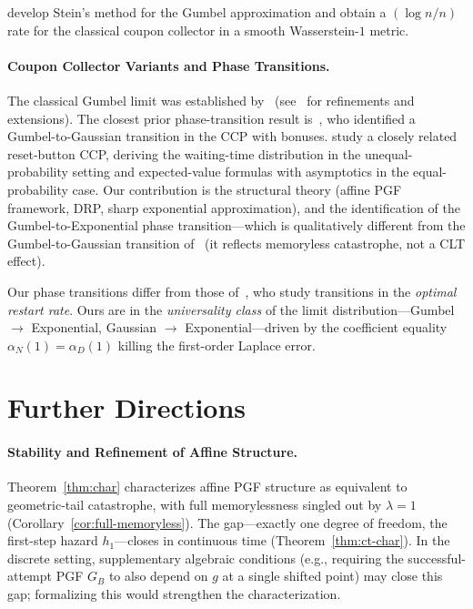 \documentclass[11pt]{article}
\theoremstyle{plain}
\theoremstyle{definition}
\theoremstyle{remark}
\begin{document}
\cite{CostacequeDecreusefond26} develop Stein's method for the Gumbel approximation and obtain a $(\log n/n)$ rate for the classical coupon collector in a smooth Wasserstein-$1$ metric.

\paragraph{Coupon Collector Variants and Phase Transitions.}
The classical Gumbel limit was established by~\cite{ER61} (see~\cite{BB65, FGT92, FS09, DP12, Neal08} for refinements and extensions).  The closest prior phase-transition result is~\cite{NK06}, who identified a Gumbel-to-Gaussian transition in the CCP with bonuses.  \cite{JT24} study a closely related reset-button CCP, deriving the waiting-time distribution in the unequal-probability setting and expected-value formulas with asymptotics in the equal-probability case.  Our contribution is the structural theory (affine PGF framework, DRP, sharp exponential approximation), and the identification of the Gumbel-to-Exponential phase transition---which is qualitatively different from the Gumbel-to-Gaussian transition of~\cite{NK06} (it reflects memoryless catastrophe, not a CLT effect).%

Our phase transitions differ from those of~\cite{PP19}, who study transitions in the \emph{optimal restart rate}.  Ours are in the \emph{universality class} of the limit distribution---Gumbel $\to$ Exponential, Gaussian $\to$ Exponential---driven by the coefficient equality $\alpha_N(1) = \alpha_D(1)$ killing the first-order Laplace error.


\section{Further Directions}\label{sec:further}

\paragraph{Stability and Refinement of Affine Structure.}
Theorem~\ref{thm:char} characterizes affine PGF structure as equivalent to geometric-tail catastrophe, with full memorylessness singled out by $\lambda = 1$ (Corollary~\ref{cor:full-memoryless}).  The gap---exactly one degree of freedom, the first-step hazard $h_1$---closes in continuous time (Theorem~\ref{thm:ct-char}).  In the discrete setting, supplementary algebraic conditions (e.g., requiring the successful-attempt PGF $G_B$ to also depend on $g$ at a single shifted point) may close this gap; formalizing this would strengthen the characterization.
\end{document}
